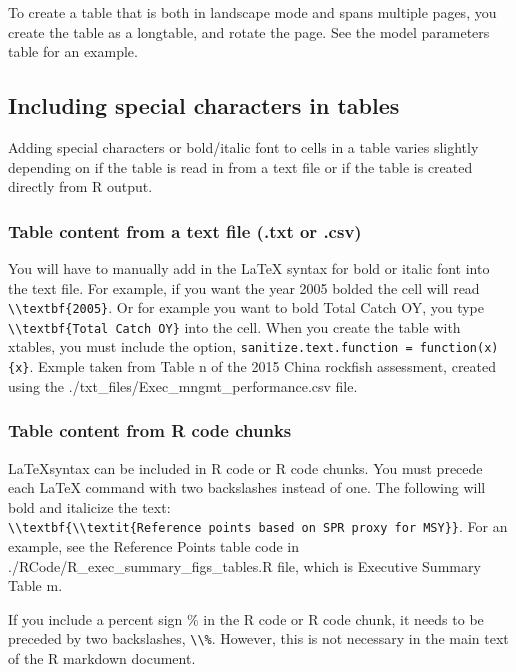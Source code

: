 \documentclass[12pt,]{article}
\begin{document}
To create a table that is both in landscape mode and spans multiple
pages, you create the table as a longtable, and rotate the page. See the
model parameters table for an example.

\subsection{Including special characters in
tables}\label{including-special-characters-in-tables}

Adding special characters or bold/italic font to cells in a table varies
slightly depending on if the table is read in from a text file or if the
table is created directly from R output.

\subsubsection{Table content from a text file (.txt or
.csv)}\label{table-content-from-a-text-file-.txt-or-.csv}

You will have to manually add in the LaTeX syntax for bold or italic
font into the text file. For example, if you want the year 2005 bolded
the cell will read
\texttt{\textbackslash{}\textbackslash{}textbf\{2005\}}. Or for example
you want to bold Total Catch OY, you type
\texttt{\textbackslash{}\textbackslash{}textbf\{Total\ Catch\ OY\}} into
the cell. When you create the table with xtables, you must include the
option, \texttt{sanitize.text.function\ =\ function(x)\{x\}}. Exmple
taken from Table n of the 2015 China rockfish assessment, created using
the ./txt\_files/Exec\_mngmt\_performance.csv file.

\subsubsection{Table content from R code
chunks}\label{table-content-from-r-code-chunks}

\LaTeX syntax can be included in R code or R code chunks. You must
precede each LaTeX command with two backslashes instead of one. The
following will bold and italicize the text:
\texttt{\textbackslash{}\textbackslash{}textbf\{\textbackslash{}\textbackslash{}textit\{Reference\ points\ based\ on\ SPR\ proxy\ for\ MSY\}\}}.
For an example, see the Reference Points table code in
./RCode/R\_exec\_summary\_figs\_tables.R file, which is Executive
Summary Table m.

If you include a percent sign \% in the R code or R code chunk, it needs
to be preceded by two backslashes,
\texttt{\textbackslash{}\textbackslash{}\%}. However, this is not
necessary in the main text of the R markdown document.
\end{document}

